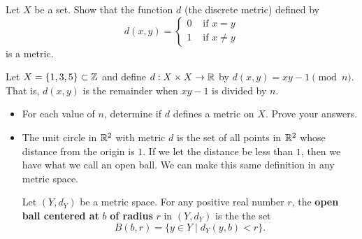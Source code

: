 {\begin{itemize}
\begin{itemize}
	\end{itemize}
	
\end{itemize}


\label{sec_metric_space_exer}

\be

\item \label{ex:MS_discrete} Let $X$ be a set.  Show that the function $d$ (the discrete metric) defined by 
\[d(x,y) = \begin{cases} 0 & \text{ if } x=y \\ 1 & \text{ if } x \neq y \end{cases}\]
is a metric. 

\begin{comment}

\ExerciseSolution Let $x$, $y$, and $z$ be in $X$. By definition, $d(x,y) \geq 0$, $d(x,y) = 0$ if and only if $x=y$, and $d(x,y) = d(y,x)$. So the only item to prove is the triangle inequality. We consider the cases $x \neq y$ and $x = y$. 
\begin{itemize}
\item If $x \neq y$, then 
\[d(x,y) + d(y,z) \geq 1 \geq d(x,z).\]
\item If $x=y$, then 
\[d(x,y) + d(y,z) = d(y,z) = d(x,z).\]
\end{itemize}
We conclude that $d$ is a metric on any set. 

\end{comment}


\item \label{ex:MS_mod_metric} Let $X = \{1,3,5\} \subset \mathbb{Z}$ and define $d: X \times X \to \mathbb{R}$ by $d(x,y) = xy - 1 \pmod{n}$. That is, $d(x,y)$ is the remainder when $xy - 1$ is divided by $n$. 
	\begin{itemize}
	\item For each value of $n$, determine if $d$ defines a metric on $X$. Prove your answers. 
	\item The unit circle in $\mathbb{R}^2$ with metric $d$ is the set of all points in $\mathbb{R}^2$ whose distance from the origin is $1$. If we let the distance be less than $1$, then we have what we call an open ball. We can make this same definition in any metric space.
	
\begin{definition} \label{def:ms_open_ball} Let $(Y, d_Y)$ be a metric space.  For any positive real number $r$, the \textbf{open ball centered at} $b$ \textbf{of radius} $r$ in $(Y, d_Y)$ is the  the set 
\[B(b,r) = \{y \in Y \mid d_Y(y,b) < r\}.\]
\end{definition}


\end{itemize}}
